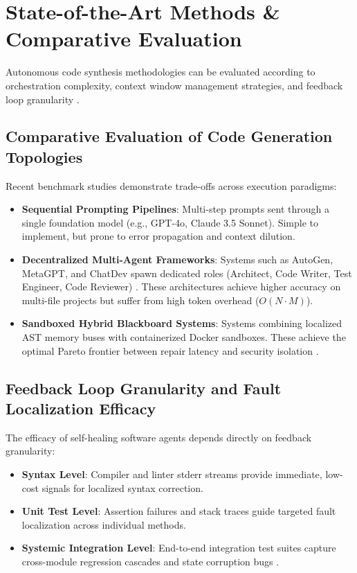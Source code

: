 \documentclass[10pt,journal,compsoc,twocolumn]{IEEEtran}
\begin{document}
\section{State-of-the-Art Methods \& Comparative Evaluation}


Autonomous code synthesis methodologies can be evaluated according to orchestration complexity, context window management strategies, and feedback loop granularity \cite{wooldridge2009}.


\subsection{Comparative Evaluation of Code Generation Topologies}

Recent benchmark studies demonstrate trade-offs across execution paradigms:
\begin{itemize}
  \item \textbf{Sequential Prompting Pipelines}: Multi-step prompts sent through a single foundation model (e.g., GPT-4o, Claude 3.5 Sonnet). Simple to implement, but prone to error propagation and context dilution.
  \item \textbf{Decentralized Multi-Agent Frameworks}: Systems such as AutoGen, MetaGPT, and ChatDev spawn dedicated roles (Architect, Code Writer, Test Engineer, Code Reviewer) \cite{feuerriegel2023generativeai}. These architectures achieve higher accuracy on multi-file projects but suffer from high token overhead (\mbox{$O(N \cdot M)$}).
  \item \textbf{Sandboxed Hybrid Blackboard Systems}: Systems combining localized AST memory buses with containerized Docker sandboxes. These achieve the optimal Pareto frontier between repair latency and security isolation \cite{openalex_w7125699492}.
\end{itemize}


\subsection{Feedback Loop Granularity and Fault Localization Efficacy}

The efficacy of self-healing software agents depends directly on feedback granularity:
\begin{itemize}
  \item \textbf{Syntax Level}: Compiler and linter stderr streams provide immediate, low-cost signals for localized syntax correction.
  \item \textbf{Unit Test Level}: Assertion failures and stack traces guide targeted fault localization across individual methods.
  \item \textbf{Systemic Integration Level}: End-to-end integration test suites capture cross-module regression cascades and state corruption bugs \cite{joshua2026adoptiondepth}.
\end{itemize}
\end{document}
